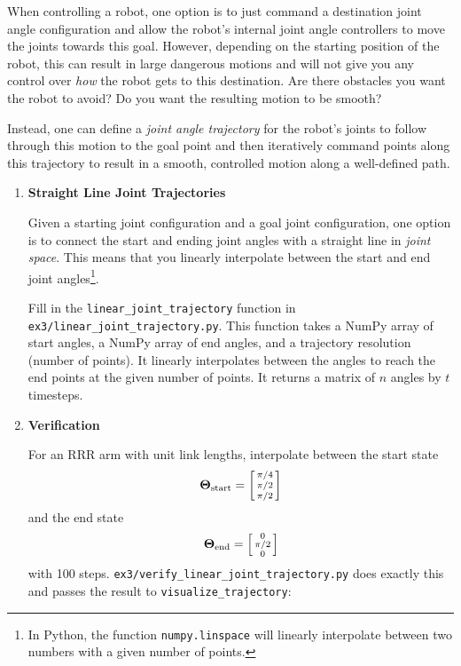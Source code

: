 \documentclass{16384_doc}
\begin{document}
\begin{questions}
\begin{enumerate} [label=\alph*.]
    \end{enumerate}


    When controlling a robot, one option is to just command a destination joint
    angle configuration and allow the robot's internal joint angle controllers
    to move the joints towards this goal. However, depending on the starting
    position of the robot, this can result in large dangerous motions and will
    not give you any control over \emph{how} the robot gets to this
    destination. Are there obstacles you want the robot to avoid? Do you want
    the resulting motion to be smooth?

    Instead, one can define a \emph{joint angle trajectory} for the robot's
    joints to follow through this motion to the goal point and then iteratively
    command points along this trajectory to result in a smooth, controlled
    motion along a well-defined path.

    \begin{enumerate} [label=\alph*.]

        \item \text{[5 points]} \textbf{Straight Line Joint Trajectories}

        Given a starting joint configuration and a goal joint configuration, one
        option is to connect the start and ending joint angles with a straight
        line in \emph{joint space}. This means that you linearly interpolate
        between the start and end joint angles\footnote{In Python, the function
        \texttt{numpy.linspace} will linearly interpolate between two numbers
        with a given number of points.}.

        Fill in the \verb!linear_joint_trajectory! function in
        \verb!ex3/linear_joint_trajectory.py!. This function takes a NumPy array
        of start angles, a NumPy array of end angles, and a trajectory resolution
        (number of points). It linearly interpolates between the angles to reach
        the end points at the given number of points. It returns a matrix of $n$
        angles by $t$ timesteps.

        \item \textbf{Verification}

        For an RRR arm with unit link lengths, interpolate between the start
        state
        \[
        \mathbf{\Theta}_{\text{start}} = \left[\begin{smallmatrix}\pi/4\\\pi/2\\\pi/2\end{smallmatrix}\right]
        \]
        and the end state
        \[
        \mathbf{\Theta}_{\text{end}} = \left[\begin{smallmatrix}0\\\pi/2\\0\end{smallmatrix}\right]
        \]
        with 100 steps. \verb!ex3/verify_linear_joint_trajectory.py! does exactly
        this and passes the result to \verb!visualize_trajectory!:


\end{enumerate}
\end{questions}
\end{document}
